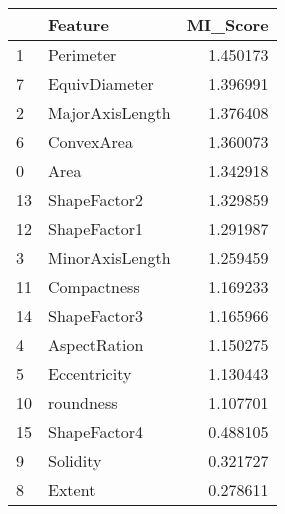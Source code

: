 \begin{tabular}{llr}
\toprule
 & Feature & MI_Score \\
\midrule
1 & Perimeter & 1.450173 \\
7 & EquivDiameter & 1.396991 \\
2 & MajorAxisLength & 1.376408 \\
6 & ConvexArea & 1.360073 \\
0 & Area & 1.342918 \\
13 & ShapeFactor2 & 1.329859 \\
12 & ShapeFactor1 & 1.291987 \\
3 & MinorAxisLength & 1.259459 \\
11 & Compactness & 1.169233 \\
14 & ShapeFactor3 & 1.165966 \\
4 & AspectRation & 1.150275 \\
5 & Eccentricity & 1.130443 \\
10 & roundness & 1.107701 \\
15 & ShapeFactor4 & 0.488105 \\
9 & Solidity & 0.321727 \\
8 & Extent & 0.278611 \\
\bottomrule
\end{tabular}
